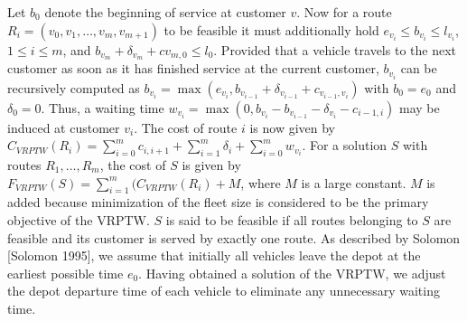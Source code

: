 \documentclass{article}
\begin{document}
Let ${b_{0}}$ denote the beginning of service at customer ${v}$. Now for a route ${R_{i} = (v_{0}, v_{1}, …, v_{m}, v_{m+1})}$ to be feasible it must additionally hold ${e_{v_{i}} \leq b_{v_{i}} \leq l_{v_{i}}}$, ${1 \leq i \leq m}$, and ${b_{v_{m}} + \delta_{v_{m}} + c{v_{m,0}} \leq l_{0}}$. Provided that a vehicle travels to the next customer as soon as it has finished service at the current customer, ${b_{v_{i}}}$ can be recursively computed as ${b_{v_{i}} = \max{(e_{v_{i}},b_{v_{i-1}}+\delta_{v_{i-1}}+c_{v_{i-1},v_{i}})}}$ with ${b_{0} = e_{0}}$ and ${\delta_{0} = 0}$. Thus, a waiting time ${w_{v_{i}} = \max{(0,b_{v_{i}}-b_{v_{i-1}}-\delta_{v_{i}}-c_{i-1,i})}}$ may be induced at customer ${v_{i}}$. The cost of route ${i}$ is now given by \\ ${C_{VRPTW}(R_{i}) = \sum_{i=0}^{m} c_{i,i+1} + \sum_{i=1}^{m} \delta_{i} + \sum_{i=0}^{m} w_{v_{i}}}$. For a solution ${S}$ with routes ${R_{1}, …, R_{m}}$, the cost of ${S}$ is given by \\ ${F_{VRPTW}(S) = \sum_{i=1}^{m}(C_{VRPTW}(R_{i})+M}$, where ${M}$ is a large constant. ${M}$ is added because minimization of the fleet size is considered to be the primary objective of the VRPTW. ${S}$ is said to be feasible if all routes belonging to ${S}$ are feasible and its customer is served by exactly one route. As described by Solomon [Solomon 1995], we assume that initially all vehicles leave the depot at the earliest possible time ${e_{0}}$. Having obtained a solution of the VRPTW, we adjust the depot departure time of each vehicle to eliminate any unnecessary waiting time.
\end{document}
